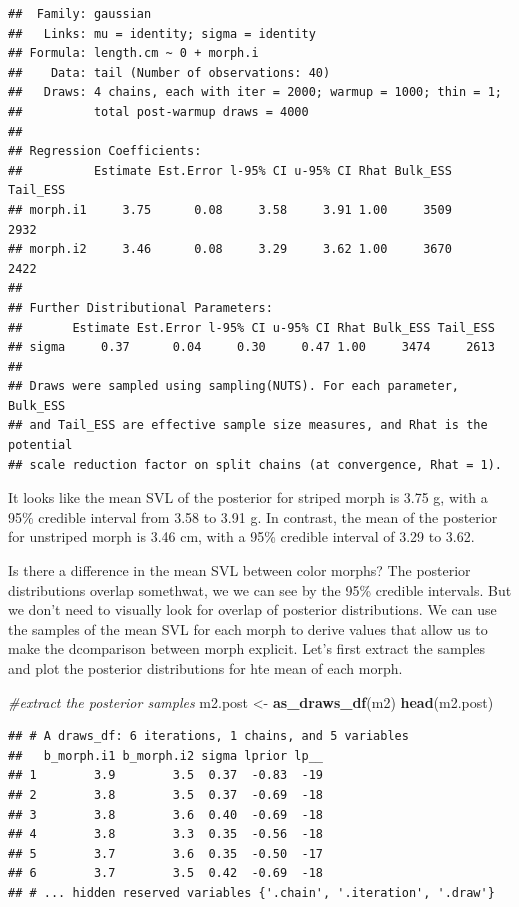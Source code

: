 \documentclass[
]{book}
\newenvironment{Shaded}{\begin{snugshade}}{\end{snugshade}}
\newcommand{\CommentTok}[1]{\textcolor[rgb]{0.56,0.35,0.01}{\textit{#1}}}
\newcommand{\FunctionTok}[1]{\textcolor[rgb]{0.13,0.29,0.53}{\textbf{#1}}}
\newcommand{\NormalTok}[1]{#1}
\newcommand{\OtherTok}[1]{\textcolor[rgb]{0.56,0.35,0.01}{#1}}
\begin{document}
\begin{verbatim}
##  Family: gaussian 
##   Links: mu = identity; sigma = identity 
## Formula: length.cm ~ 0 + morph.i 
##    Data: tail (Number of observations: 40) 
##   Draws: 4 chains, each with iter = 2000; warmup = 1000; thin = 1;
##          total post-warmup draws = 4000
## 
## Regression Coefficients:
##          Estimate Est.Error l-95% CI u-95% CI Rhat Bulk_ESS Tail_ESS
## morph.i1     3.75      0.08     3.58     3.91 1.00     3509     2932
## morph.i2     3.46      0.08     3.29     3.62 1.00     3670     2422
## 
## Further Distributional Parameters:
##       Estimate Est.Error l-95% CI u-95% CI Rhat Bulk_ESS Tail_ESS
## sigma     0.37      0.04     0.30     0.47 1.00     3474     2613
## 
## Draws were sampled using sampling(NUTS). For each parameter, Bulk_ESS
## and Tail_ESS are effective sample size measures, and Rhat is the potential
## scale reduction factor on split chains (at convergence, Rhat = 1).
\end{verbatim}

It looks like the mean SVL of the posterior for striped morph is 3.75 g, with a 95\% credible interval from 3.58 to 3.91 g. In contrast, the mean of the posterior for unstriped morph is 3.46 cm, with a 95\% credible interval of 3.29 to 3.62.

Is there a difference in the mean SVL between color morphs? The posterior distributions overlap somethwat, we we can see by the 95\% credible intervals. But we don't need to visually look for overlap of posterior distributions. We can use the samples of the mean SVL for each morph to derive values that allow us to make the dcomparison between morph explicit. Let's first extract the samples and plot the posterior distributions for hte mean of each morph.

\begin{Shaded}
\begin{Highlighting}[]
\CommentTok{\#extract the posterior samples}
\NormalTok{m2.post }\OtherTok{\textless{}{-}} \FunctionTok{as\_draws\_df}\NormalTok{(m2)}
\FunctionTok{head}\NormalTok{(m2.post)}
\end{Highlighting}
\end{Shaded}

\begin{verbatim}
## # A draws_df: 6 iterations, 1 chains, and 5 variables
##   b_morph.i1 b_morph.i2 sigma lprior lp__
## 1        3.9        3.5  0.37  -0.83  -19
## 2        3.8        3.5  0.37  -0.69  -18
## 3        3.8        3.6  0.40  -0.69  -18
## 4        3.8        3.3  0.35  -0.56  -18
## 5        3.7        3.6  0.35  -0.50  -17
## 6        3.7        3.5  0.42  -0.69  -18
## # ... hidden reserved variables {'.chain', '.iteration', '.draw'}
\end{verbatim}
\end{document}
